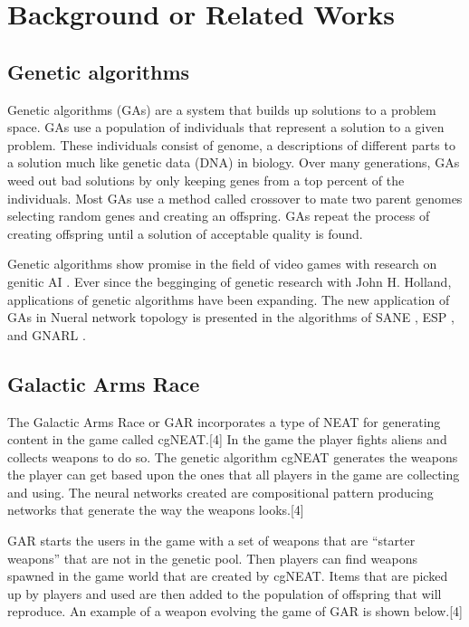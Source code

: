 \documentclass[12pt]{ucthesis} \newif\ifpdf \ifx\pdfoutput\undefined
\begin{document}
\chapter{Background or Related Works}


\section{Genetic algorithms}

Genetic algorithms (GAs) are a system that builds up solutions to a problem
space. GAs use a population of individuals that represent a solution to a given
problem. These individuals consist of genome, a descriptions of different parts
to a solution much like genetic data (DNA) in biology. Over many generations,
GAs weed out bad solutions by only keeping genes from a top percent of the
individuals. Most GAs use a method called crossover to mate two parent genomes
selecting random genes and creating an offspring. GAs repeat the process of
creating offspring until a solution of acceptable quality is found.

Genetic algorithms show promise in the field of video games with research on
genitic AI \cite{Revello,PengHuo,Chih-Sheng}. Ever since the begginging of
genetic research with John H. Holland, applications of genetic algorithms have
been expanding. The new application of GAs in Nueral network topology is
presented in the algorithms of SANE \cite{moriarty:focus} , ESP
\cite{gomez:proposal} , and GNARL \cite{Angeline}.


\section{Galactic Arms Race}

The Galactic Arms Race or GAR incorporates a type of NEAT for generating content
in the game called cgNEAT.[4] In the game the player fights aliens and collects
weapons to do so. The genetic algorithm cgNEAT generates the weapons the player
can get based upon the ones that all players in the game are collecting and
using. The neural networks created are compositional pattern producing networks
that generate the way the weapons looks.[4]

GAR starts the users in the game with a set of weapons that are “starter
weapons” that are not in the genetic pool. Then players can find weapons spawned
in the game world that are created by cgNEAT. Items that are picked up by
players and used are then added to the population of offspring that will
reproduce. An example of a weapon evolving the game of GAR is shown below.[4]
\end{document}
